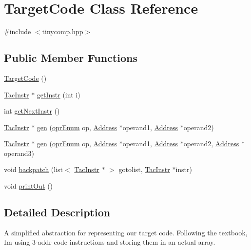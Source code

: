\hypertarget{class_target_code}{}\section{Target\+Code Class Reference}
\label{class_target_code}


{\ttfamily \#include $<$tinycomp.\+hpp$>$}

\subsection*{Public Member Functions}
\begin{DoxyCompactItemize}
\item 
\hyperlink{class_target_code_ac5d1d427ace51cd109c586279543db80}{Target\+Code} ()
\item 
\hyperlink{class_tac_instr}{Tac\+Instr} $\ast$ \hyperlink{class_target_code_a4071467d8e74b5eaf495375cb3e4e2c0}{get\+Instr} (int i)
\item 
int \hyperlink{class_target_code_af38db8dcd404aab0757238b8634a2dbf}{get\+Next\+Instr} ()
\item 
\hyperlink{class_tac_instr}{Tac\+Instr} $\ast$ \hyperlink{class_target_code_a04e3ad62e9ead1c9237f1ba0d90e7b83}{gen} (\hyperlink{tinycomp_8h_a042125b56c7cb23c8c11e3aeb8de20cc}{opr\+Enum} op, \hyperlink{class_address}{Address} $\ast$operand1, \hyperlink{class_address}{Address} $\ast$operand2)
\item 
\hyperlink{class_tac_instr}{Tac\+Instr} $\ast$ \hyperlink{class_target_code_aff3458f28e2175256063869c4ee688f6}{gen} (\hyperlink{tinycomp_8h_a042125b56c7cb23c8c11e3aeb8de20cc}{opr\+Enum} op, \hyperlink{class_address}{Address} $\ast$operand1, \hyperlink{class_address}{Address} $\ast$operand2, \hyperlink{class_address}{Address} $\ast$operand3)
\item 
void \hyperlink{class_target_code_a8930a15f8287301265e46ba5dc5d6fe0}{backpatch} (list$<$ \hyperlink{class_tac_instr}{Tac\+Instr} $\ast$ $>$ gotolist, \hyperlink{class_tac_instr}{Tac\+Instr} $\ast$instr)
\item 
void \hyperlink{class_target_code_a252a90959cffeeff1c93cfb3e47c5ab9}{print\+Out} ()
\end{DoxyCompactItemize}


\subsection{Detailed Description}
A simplified abstraction for representing our target code. Following the textbook, I\textquotesingle{}m using 3-\/addr code instructions and storing them in an actual array. 

